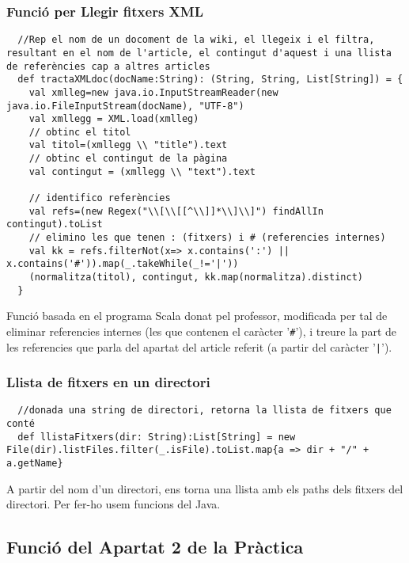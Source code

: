 \documentclass[11pt,a4paper,twoside]{report}
\begin{document}
\subsubsection{Funció per Llegir fitxers XML}
\begin{lstlisting}
  //Rep el nom de un docoment de la wiki, el llegeix i el filtra, resultant en el nom de l'article, el contingut d'aquest i una llista de referències cap a altres articles
  def tractaXMLdoc(docName:String): (String, String, List[String]) = {
    val xmlleg=new java.io.InputStreamReader(new java.io.FileInputStream(docName), "UTF-8")
    val xmllegg = XML.load(xmlleg)
    // obtinc el titol
    val titol=(xmllegg \\ "title").text
    // obtinc el contingut de la pàgina
    val contingut = (xmllegg \\ "text").text

    // identifico referències
    val refs=(new Regex("\\[\\[[^\\]]*\\]\\]") findAllIn contingut).toList
    // elimino les que tenen : (fitxers) i # (referencies internes)
    val kk = refs.filterNot(x=> x.contains(':') || x.contains('#')).map(_.takeWhile(_!='|'))
    (normalitza(titol), contingut, kk.map(normalitza).distinct)
  }
\end{lstlisting}

Funció basada en el programa Scala donat pel professor, modificada per tal de eliminar referencies internes
(les que contenen el caràcter '\texttt{\#}'), i treure la part de les referencies que parla del apartat del article referit
(a partir del caràcter '\texttt{|}').


\subsubsection{Llista de fitxers en un directori}
\begin{lstlisting}
  //donada una string de directori, retorna la llista de fitxers que conté
  def llistaFitxers(dir: String):List[String] = new File(dir).listFiles.filter(_.isFile).toList.map{a => dir + "/" + a.getName}
\end{lstlisting}

A partir del nom d'un directori, ens torna una llista amb els paths dels fitxers del directori.
Per fer-ho usem funcions del Java.

\subsection{Funció del Apartat 2 de la Pràctica}
\end{document}
